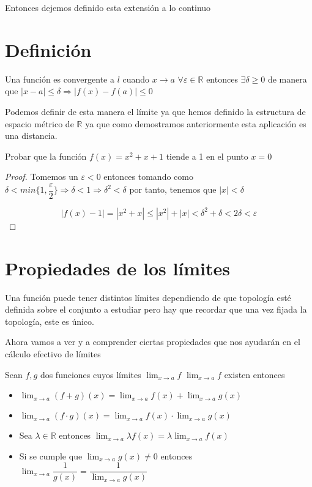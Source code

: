 Entonces dejemos definido esta extensión a lo continuo 
\section{Definición}

\begin{defi}
Una función es convergente a $l$ cuando $x\to a$ $\forall \varepsilon \in \mathbb{R}$ entonces $\exists \delta \geq 0 $ de manera que $|x-a|\leq \delta \Rightarrow |f(x)-f(a)|\leq 0$
\end{defi}

Podemos definir de esta manera el límite ya que hemos definido la estructura de espacio métrico de $\mathbb{R}$ ya que como demostramos anteriormente esta aplicación es una distancia. 

\begin{ejercicio}
Probar que la función $f(x)=x^2+x+1$ tiende a 1 en el punto $x=0$
\end{ejercicio}
\begin{proof}
Tomemos un $\varepsilon < 0$ entonces tomando como $\delta < min\lbrace 1, \dfrac{\varepsilon}{2}\rbrace\Rightarrow \delta <1 \Rightarrow \delta^2 <\delta$ por tanto, tenemos que $|x|<\delta$  

\begin{equation*}
|f(x)-1|=|x^2+x|\leq |x^2|+|x|< \delta^2+\delta<2\delta < \varepsilon
\end{equation*}
\end{proof}

\section{Propiedades de los límites}

\noindent
Una función puede tener distintos límites dependiendo de que topología esté definida sobre el conjunto a estudiar pero hay que recordar que una vez fijada la topología, este es único.
\noindent


Ahora vamos a ver y a comprender ciertas propiedades que nos ayudarán en el cálculo efectivo de límites\\[2ex]

\begin{proposicion}
Sean $f, g$ dos funciones cuyos límites $\lim_{x\to a} f$ $\lim_{x\to a} f$ existen entonces 
\begin{itemize}
\item $\displaystyle\lim_{x\to a}(f+g)(x)=\lim_{x\to a}f(x)+ \lim_{x\to a} g(x)$
\item $\displaystyle\lim_{x\to a} (f\cdot g)(x)=\lim_{x\to a}f(x)\cdot \lim_{x\to a}g(x)$
\item Sea $\lambda \in \mathbb{R}$ entonces $\displaystyle\lim_{x\to a}\lambda f(x)=\lambda \lim_{x\to a} f(x)$
\item Si se cumple que $\displaystyle\lim_{x\to a} g(x)\neq 0$ entonces $\displaystyle\lim_{x\to a} \dfrac{1}{g(x)}=\dfrac{1}{\lim_{x\to a} g(x)}$
\end{itemize}
\end{proposicion}
